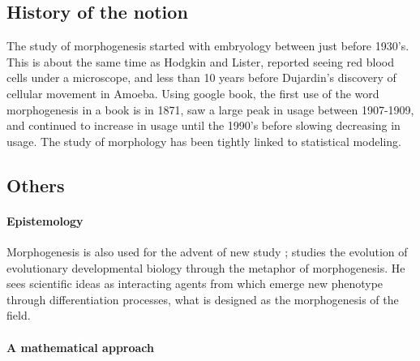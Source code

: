 \documentclass[fleqn,10pt]{wlscirep}
\begin{document}
\subsection*{History of the notion}
The study of morphogenesis started with embryology between just before 1930's. This is about the same time as Hodgkin and Lister, reported seeing red blood cells under a microscope, and less than 10 years before Dujardin's discovery of cellular movement in Amoeba. \cite{abercrombie1977concepts} Using google book, the first use of the word morphogenesis in a book is in 1871, saw a large peak in usage between 1907-1909, and continued to increase in usage until the 1990's before slowing decreasing in usage. 
The study of morphology has been tightly linked to statistical modeling. 



\subsection*{Others}

\paragraph{Epistemology}

Morphogenesis is also used for the advent of new study ;  \cite{gilbert2003morphogenesis} studies the evolution of evolutionary developmental biology through the metaphor of morphogenesis. He sees scientific ideas as interacting agents from which emerge new phenotype through differentiation processes, what is designed as the morphogenesis of the field.


\paragraph{A mathematical approach}
\end{document}
